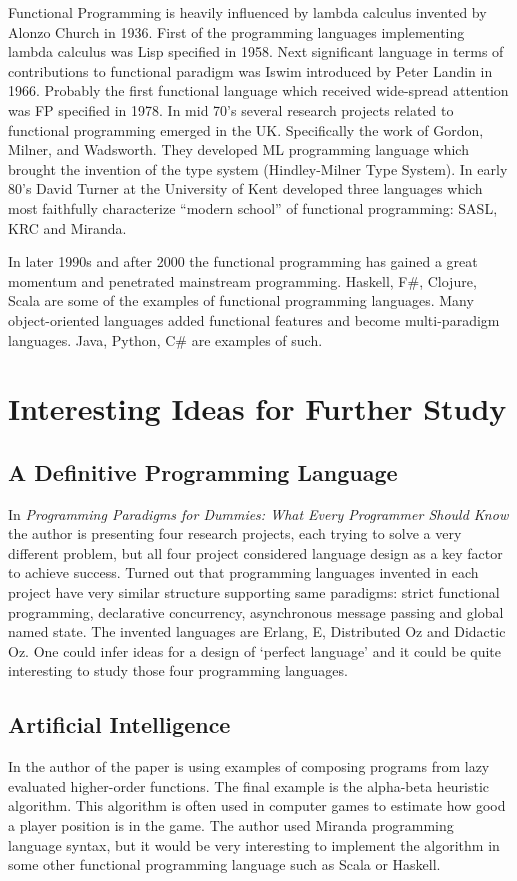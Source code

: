 \documentclass[12pt,twoside,a4paper]{report}
\begin{document}
Functional Programming is heavily influenced by lambda calculus invented by Alonzo Church in 1936. First of the programming languages implementing lambda calculus was Lisp specified in 1958. Next significant language in terms of contributions to functional paradigm was Iswim introduced by Peter Landin in 1966. Probably the first functional language which received wide-spread attention was FP specified in 1978. In mid 70’s several research projects related to functional programming emerged in the UK. Specifically the work of Gordon, Milner, and Wadsworth. They developed ML programming language which brought the invention of the type system (Hindley-Milner Type System). In early 80’s David Turner at the University of Kent developed three languages which most faithfully characterize “modern school” of functional programming: SASL, KRC and Miranda. \cite{12}

In later 1990s and after 2000 the functional programming has gained a great momentum and penetrated mainstream programming. Haskell, F\#, Clojure, Scala are some of the examples of functional programming languages. Many object-oriented languages added functional features and become multi-paradigm languages. Java, Python, C\# are examples of such.

\section{Interesting Ideas for Further Study}\label{2.5}

\subsection{A Definitive Programming Language}\label{2.5.1}
In \emph{Programming Paradigms for Dummies: What Every Programmer Should Know}\cite{16} the author is presenting four research projects, each trying to solve a very different problem, but all four project considered language design as a key factor to achieve success. Turned out that programming languages invented in each project have very similar structure supporting same paradigms: strict functional programming, declarative concurrency, asynchronous message passing and global named state. The invented languages are Erlang, E, Distributed Oz and Didactic Oz. One could infer ideas for a design of ‘perfect language’ and it could be quite interesting to study those four programming languages.

\subsection{Artificial Intelligence}\label{2.5.2}
In \cite{14} the author of the paper is using examples of composing programs from lazy evaluated higher-order functions. The final example is the alpha-beta heuristic algorithm. This algorithm is often used in computer games to estimate how good a player position is in the game. The author used Miranda programming language syntax, but it would be very interesting to implement the algorithm in some other functional programming language such as Scala or Haskell.
\end{document}
